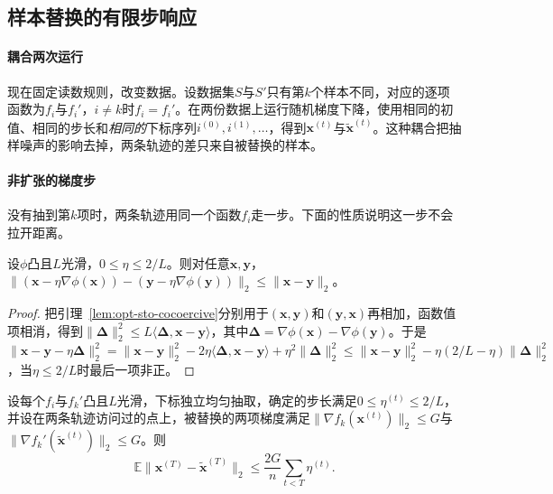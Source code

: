 \subsection{样本替换的有限步响应}
\label{sec:opt-sto-stability}

\paragraph{耦合两次运行}
现在固定读数规则，改变数据。设数据集$S$与$S'$只有第$k$个样本不同，对应的逐项函数为$f_i$与$f_i'$，$i\neq k$时$f_i=f_i'$。在两份数据上运行随机梯度下降，使用相同的初值、相同的步长和\emph{相同的}下标序列$i^{(0)},i^{(1)},\dots$，得到$\bm x^{(t)}$与$\tilde{\bm x}^{(t)}$。这种耦合把抽样噪声的影响去掉，两条轨迹的差只来自被替换的样本。

\paragraph{非扩张的梯度步}
没有抽到第$k$项时，两条轨迹用同一个函数$f_i$走一步。下面的性质说明这一步不会拉开距离。

\begin{lemma}[凸光滑函数梯度步的非扩张性]
\label{lem:opt-sto-nonexpansive}
设$\phi$凸且$L$光滑，$0\leq\eta\leq2/L$。则对任意$\bm x,\bm y$，$\lVert(\bm x-\eta\nabla\phi(\bm x))-(\bm y-\eta\nabla\phi(\bm y))\rVert_2\leq\lVert\bm x-\bm y\rVert_2$。
\end{lemma}

\begin{proof}
把引理~\ref{lem:opt-sto-cocoercive}分别用于$(\bm x,\bm y)$和$(\bm y,\bm x)$再相加，函数值项相消，得到$\lVert\bm\Delta\rVert_2^2\leq L\langle\bm\Delta,\bm x-\bm y\rangle$，其中$\bm\Delta=\nabla\phi(\bm x)-\nabla\phi(\bm y)$。于是
$\lVert\bm x-\bm y-\eta\bm\Delta\rVert_2^2=\lVert\bm x-\bm y\rVert_2^2-2\eta\langle\bm\Delta,\bm x-\bm y\rangle+\eta^2\lVert\bm\Delta\rVert_2^2\leq\lVert\bm x-\bm y\rVert_2^2-\eta(2/L-\eta)\lVert\bm\Delta\rVert_2^2$，当$\eta\leq2/L$时最后一项非正。
\end{proof}

\begin{theorem}[样本替换下的期望参数距离]
\label{thm:opt-sto-stability}
设每个$f_i$与$f_k'$凸且$L$光滑，下标独立均匀抽取，确定的步长满足$0\leq\eta^{(t)}\leq2/L$，并设在两条轨迹访问过的点上，被替换的两项梯度满足$\lVert\nabla f_k(\bm x^{(t)})\rVert_2\leq G$与$\lVert\nabla f_k'(\tilde{\bm x}^{(t)})\rVert_2\leq G$。则
\begin{equation}
\label{eq:opt-sto-stability}
  \mathbb E\lVert\bm x^{(T)}-\tilde{\bm x}^{(T)}\rVert_2\leq\frac{2G}{n}\sum_{t<T}\eta^{(t)} .
\end{equation}
\end{theorem}


